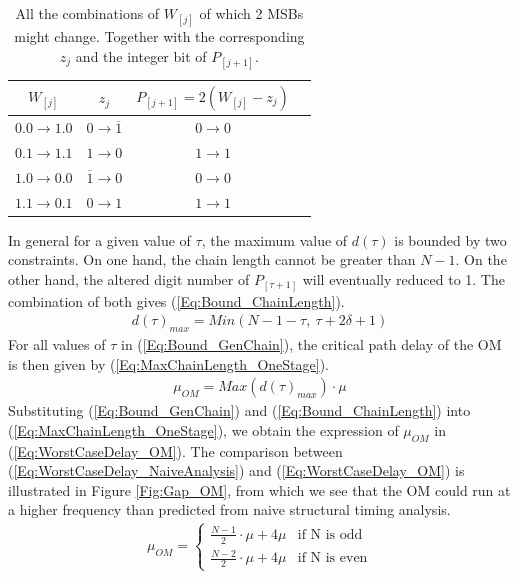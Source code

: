 \documentclass{acm_proc_article-sp}
\begin{document}
%
\begin{table}[tbp]
\centering
\caption{All the combinations of ${W}_{[j]}$ of which 2 MSBs might change. Together with the corresponding $z_j$ and the integer bit of $P_{[j+1]}$.}
\begin{tabular}{|c|c|c|c|}
\hline
${W}_{[j]}$&$z_j$&$P_{[j+1]}=2(W_{[j]}-z_j)$\\ \hline
 $0.0\rightarrow1.0$ & $0\rightarrow\overline{1}$ & $0\rightarrow0$\\ \hline
 $0.1\rightarrow1.1$ & $1\rightarrow0$ & $1\rightarrow1$\\ \hline
 $1.0\rightarrow0.0$ & $\overline{1}\rightarrow0$ & $0\rightarrow0$\\ \hline
 $1.1\rightarrow0.1$ & $0\rightarrow{1}$ & $1\rightarrow1$\\  \hline
\end{tabular}
\label{Tab:Annihilation}
\vspace{-2ex}
\end{table}

In general for a given value of $\tau$, the maximum value of $d(\tau)$ is bounded by two constraints. On one hand, the chain length cannot be greater than $N-1$. On the other hand, the altered digit number of $P_{[\tau+1]}$ will eventually reduced to 1. The combination of both gives (\ref{Eq:Bound_ChainLength}).
%
\begin{eqnarray}\label{Eq:Bound_ChainLength}
  d(\tau)_{max}=Min(N-1-\tau,~\tau+2\delta+1)
\end{eqnarray}
For all values of $\tau$ in (\ref{Eq:Bound_GenChain}), the critical path delay of the OM is then given by (\ref{Eq:MaxChainLength_OneStage}).
%
\begin{eqnarray}\label{Eq:MaxChainLength_OneStage}
  \mu_{OM}=Max(d(\tau)_{max})\cdot\mu
\end{eqnarray}
%
Substituting (\ref{Eq:Bound_GenChain}) and (\ref{Eq:Bound_ChainLength}) into (\ref{Eq:MaxChainLength_OneStage}), we obtain the expression of $\mu_{OM}$ in (\ref{Eq:WorstCaseDelay_OM}). The comparison between (\ref{Eq:WorstCaseDelay_NaiveAnalysis}) and (\ref{Eq:WorstCaseDelay_OM}) is illustrated in Figure \ref{Fig:Gap_OM}, from which we see that the OM could run at a higher frequency than predicted from naive structural timing analysis.
%
\begin{eqnarray}\label{Eq:WorstCaseDelay_OM}
  \mu_{OM} = \begin{cases}
    \frac{N-1}{2}\cdot\mu+4\mu & \text{if N is odd}\\
    \frac{N-2}{2}\cdot\mu+4\mu & \text{if N is even}
  \end{cases}
\end{eqnarray}
\end{document}
